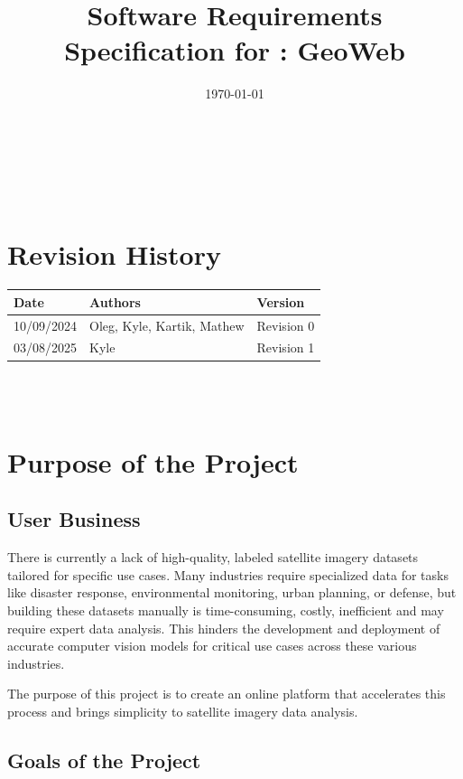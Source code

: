 \documentclass[12pt]{article}
\begin{document}
\title{Software Requirements Specification for \progname: GeoWeb} 
\author{\authname}
\date{\today}
	
\maketitle

~\newpage


\tableofcontents

~\newpage

\section*{Revision History}

\begin{tabularx}{\textwidth}{p{3cm}p{2cm}X}
\toprule {\textbf{Date}} & {\textbf{Authors}} & {\textbf{Version}}\\
\midrule
10/09/2024 & Oleg, Kyle, Kartik, Mathew & Revision 0\\
\midrule
03/08/2025 & Kyle & Revision 1\\
\bottomrule
\end{tabularx}

~\\

~\newpage
\section{Purpose of the Project}
\subsection{User Business}
There is currently a lack of high-quality, labeled satellite imagery datasets tailored for specific use cases. Many industries require specialized data for tasks like disaster 
response, environmental monitoring, urban planning, or defense, but building these datasets manually is time-consuming, costly, inefficient and may require expert data analysis. 
This hinders the development and deployment of accurate computer vision models for critical use cases across these various industries.

The purpose of this project is to create an online platform that accelerates this process and brings simplicity to satellite imagery data analysis.
\subsection{Goals of the Project}
\end{document}
